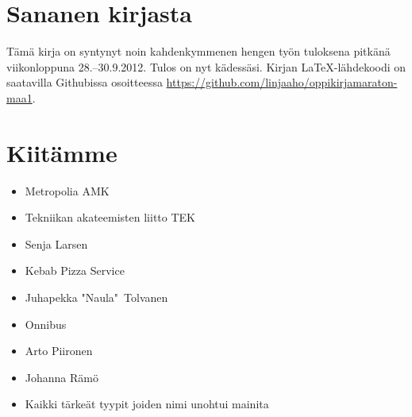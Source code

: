 \section*{Sananen kirjasta}

Tämä kirja on syntynyt noin kahdenkymmenen hengen työn tuloksena pitkänä viikonloppuna 28.--30.9.2012. Tulos on nyt kädessäsi. Kirjan \LaTeX-lähdekoodi on saatavilla Githubissa osoitteessa \url{https://github.com/linjaaho/oppikirjamaraton-maa1}.



\section*{Kiitämme}
\begin{itemize}
\item Metropolia AMK
\item Tekniikan akateemisten liitto TEK
\item Senja Larsen
\item Kebab Pizza Service
\item Juhapekka "Naula"\ Tolvanen
\item Onnibus
\item Arto Piironen
\item Johanna Rämö
\item Kaikki tärkeät tyypit joiden nimi unohtui mainita
\end{itemize}


